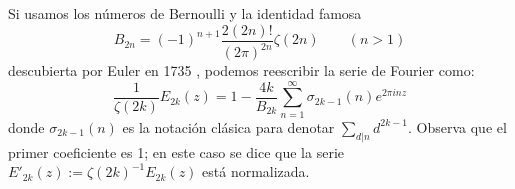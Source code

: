 Si usamos los n\'umeros de Bernoulli y la identidad famosa
\[
  B_{2n}=(-1)^{n+1}\frac{2(2n)!}{(2\pi)^{2n}}\zeta(2n)\qquad (n>1)
\]
descubierta por Euler en 1735 \cite{EulerDSSR}, podemos reescribir la serie de Fourier como:
\[
  \frac{1}{\zeta(2k)}E_{2k}(z)=1-\frac{4k}{B_{2k}}\sum_{n=1}^{\infty}\sigma_{2k-1}(n)e^{2\pi inz}
\]
donde $\sigma_{2k-1}(n)$ es la notaci\'on cl\'asica para denotar $\sum_{d|n}d^{2k-1}$. Observa
que el primer coeficiente es 1; en este caso se dice que la serie $E'_{2k}(z):=\zeta(2k)^{-1}E_{2k}(z)$
est\'a normalizada.

